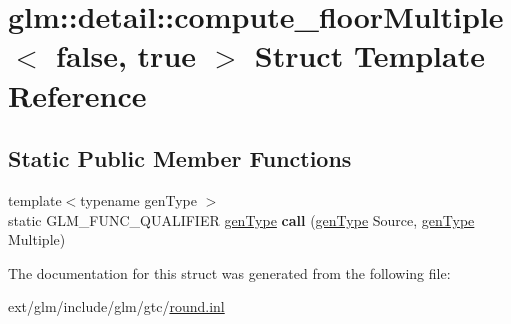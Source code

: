 \hypertarget{structglm_1_1detail_1_1compute__floor_multiple_3_01false_00_01true_01_4}{\section{glm\-:\-:detail\-:\-:compute\-\_\-floor\-Multiple$<$ false, true $>$ Struct Template Reference}
\label{structglm_1_1detail_1_1compute__floor_multiple_3_01false_00_01true_01_4}
}
\subsection*{Static Public Member Functions}
\begin{DoxyCompactItemize}
\item 
\hypertarget{structglm_1_1detail_1_1compute__floor_multiple_3_01false_00_01true_01_4_a1d2dfa9746c67e805de83b41b6a7a94d}{{\footnotesize template$<$typename gen\-Type $>$ }\\static G\-L\-M\-\_\-\-F\-U\-N\-C\-\_\-\-Q\-U\-A\-L\-I\-F\-I\-E\-R \hyperlink{structglm_1_1detail_1_1gen_type}{gen\-Type} {\bfseries call} (\hyperlink{structglm_1_1detail_1_1gen_type}{gen\-Type} Source, \hyperlink{structglm_1_1detail_1_1gen_type}{gen\-Type} Multiple)}\label{structglm_1_1detail_1_1compute__floor_multiple_3_01false_00_01true_01_4_a1d2dfa9746c67e805de83b41b6a7a94d}

\end{DoxyCompactItemize}


The documentation for this struct was generated from the following file\-:\begin{DoxyCompactItemize}
\item 
ext/glm/include/glm/gtc/\hyperlink{round_8inl}{round.\-inl}\end{DoxyCompactItemize}
